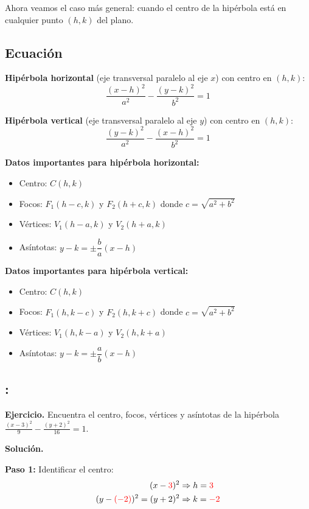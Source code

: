 \documentclass[12pt,a4paper]{article}
\begin{document}
	Ahora veamos el caso más general: cuando el centro de la hipérbola está en cualquier punto $(h,k)$ del plano.

	\subsection*{Ecuación}

	\textbf{Hipérbola horizontal} (eje transversal paralelo al eje $x$) con centro en $(h,k)$:
	\[
	\boxed{\frac{(x-h)^2}{a^2}-\frac{(y-k)^2}{b^2}=1}
	\]

	\textbf{Hipérbola vertical} (eje transversal paralelo al eje $y$) con centro en $(h,k)$:
	\[
	\boxed{\frac{(y-k)^2}{a^2}-\frac{(x-h)^2}{b^2}=1}
	\]

	\textbf{Datos importantes para hipérbola horizontal:}
	\begin{itemize}
		\item Centro: $C(h,k)$
		\item Focos: $F_1(h-c,k)$ y $F_2(h+c,k)$ donde $c=\sqrt{a^2+b^2}$
		\item Vértices: $V_1(h-a,k)$ y $V_2(h+a,k)$
		\item Asíntotas: $y-k=\pm\dfrac{b}{a}(x-h)$
	\end{itemize}

	\textbf{Datos importantes para hipérbola vertical:}
	\begin{itemize}
		\item Centro: $C(h,k)$
		\item Focos: $F_1(h,k-c)$ y $F_2(h,k+c)$ donde $c=\sqrt{a^2+b^2}$
		\item Vértices: $V_1(h,k-a)$ y $V_2(h,k+a)$
		\item Asíntotas: $y-k=\pm\dfrac{a}{b}(x-h)$
	\end{itemize}

	\subsection*{{\color{blue!40!red}{Ejemplo 3}}: \color{blue!80!black}{Hipérbola horizontal con centro fuera del origen}}

	\textbf{Ejercicio.} Encuentra el centro, focos, vértices y asíntotas de la hipérbola $\displaystyle\frac{(x-3)^2}{9}-\frac{(y+2)^2}{16}=1$.

	\bigskip

	\textbf{Solución.}

	\bigskip

	\textbf{Paso 1:} Identificar el centro:
	\[
	\begin{aligned}
		(x-{\color{red}{3}})^2&\Rightarrow h={\color{red}{3}}\\
		(y-{\color{red}{(-2)}})^2=(y+2)^2&\Rightarrow k={\color{red}{-2}}
	\end{aligned}
	\]
\end{document}
